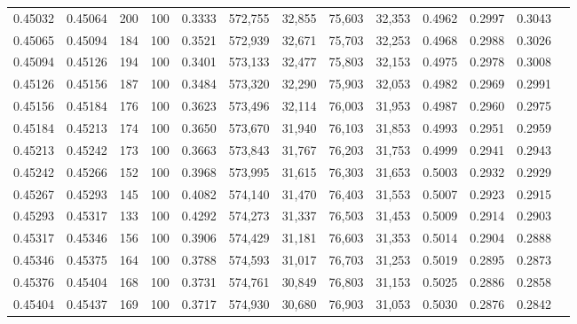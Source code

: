 \begin{tabular}{rrrrrrrrrrrrr}
0.45032 & 0.45064 &    200 & 100 &                                     0.3333 & 572,755 &  32,855 &  75,603 &  32,353 & 0.4962 & 0.2997 & 0.3043 \\
0.45065 & 0.45094 &    184 & 100 &                                     0.3521 & 572,939 &  32,671 &  75,703 &  32,253 & 0.4968 & 0.2988 & 0.3026 \\
0.45094 & 0.45126 &    194 & 100 &                                     0.3401 & 573,133 &  32,477 &  75,803 &  32,153 & 0.4975 & 0.2978 & 0.3008 \\
0.45126 & 0.45156 &    187 & 100 &                                     0.3484 & 573,320 &  32,290 &  75,903 &  32,053 & 0.4982 & 0.2969 & 0.2991 \\
0.45156 & 0.45184 &    176 & 100 &                                     0.3623 & 573,496 &  32,114 &  76,003 &  31,953 & 0.4987 & 0.2960 & 0.2975 \\
0.45184 & 0.45213 &    174 & 100 &                                     0.3650 & 573,670 &  31,940 &  76,103 &  31,853 & 0.4993 & 0.2951 & 0.2959 \\
0.45213 & 0.45242 &    173 & 100 &                                     0.3663 & 573,843 &  31,767 &  76,203 &  31,753 & 0.4999 & 0.2941 & 0.2943 \\
0.45242 & 0.45266 &    152 & 100 &                                     0.3968 & 573,995 &  31,615 &  76,303 &  31,653 & 0.5003 & 0.2932 & 0.2929 \\
0.45267 & 0.45293 &    145 & 100 &                                     0.4082 & 574,140 &  31,470 &  76,403 &  31,553 & 0.5007 & 0.2923 & 0.2915 \\
0.45293 & 0.45317 &    133 & 100 &                                     0.4292 & 574,273 &  31,337 &  76,503 &  31,453 & 0.5009 & 0.2914 & 0.2903 \\
0.45317 & 0.45346 &    156 & 100 &                                     0.3906 & 574,429 &  31,181 &  76,603 &  31,353 & 0.5014 & 0.2904 & 0.2888 \\
0.45346 & 0.45375 &    164 & 100 &                                     0.3788 & 574,593 &  31,017 &  76,703 &  31,253 & 0.5019 & 0.2895 & 0.2873 \\
0.45376 & 0.45404 &    168 & 100 &                                     0.3731 & 574,761 &  30,849 &  76,803 &  31,153 & 0.5025 & 0.2886 & 0.2858 \\
0.45404 & 0.45437 &    169 & 100 &                                     0.3717 & 574,930 &  30,680 &  76,903 &  31,053 & 0.5030 & 0.2876 & 0.2842 \\

\end{tabular}
